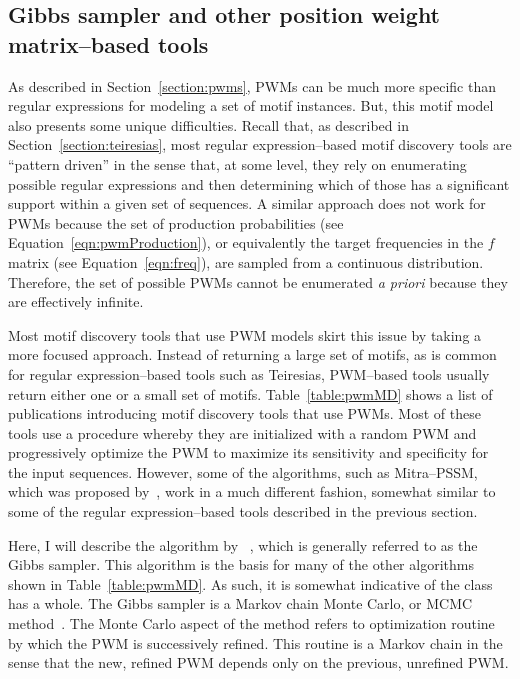\subsection*{Gibbs sampler and other position weight matrix--based tools}

As described in Section~\vref{section:pwms}, PWMs can be much more
specific than regular expressions for modeling a set of motif
instances.  But, this motif model also presents some unique
difficulties.  Recall that, as described in
Section~\vref{section:teiresias}, most regular expression--based
motif discovery tools are ``pattern driven'' in the sense that, at
some level, they rely on enumerating possible regular expressions
and then determining which of those has a significant support within
a given set of sequences.  A similar approach does not work for PWMs
because the set of production probabilities (see
Equation~\vref{eqn:pwmProduction}), or equivalently the target
frequencies in the $f$ matrix (see Equation~\vref{eqn:freq}), are
sampled from a continuous distribution.  Therefore, the set of
possible PWMs cannot be enumerated \emph{a priori} because they are
effectively infinite.

Most motif discovery tools that use PWM models skirt this issue by
taking a more focused approach.  Instead of returning a large set of
motifs, as is common for regular expression--based tools such as
Teiresias, PWM--based tools usually return either one or a small set
of motifs.  Table~\vref{table:pwmMD} shows a list of publications
introducing motif discovery tools that use PWMs.  Most of these
tools use a procedure whereby they are initialized with a random PWM
and progressively optimize the PWM to maximize its sensitivity and
specificity for the input sequences. However, some of the
algorithms, such as Mitra--PSSM, which was proposed
by~\citet{eskin2004from}, work in a much different fashion, somewhat
similar to some of the regular expression--based tools described in
the previous section.



Here, I will describe the algorithm by
~\citet{lawrence1993detecting}, which is generally referred to as
the Gibbs sampler.  This algorithm is the basis for many of the
other algorithms shown in Table~\ref{table:pwmMD}.  As such, it is
somewhat indicative of the class has a whole. The Gibbs sampler is a
Markov chain Monte Carlo, or MCMC
method~\cite{metropolis1953equation,liu2001monte}.  The Monte Carlo
aspect of the method refers to optimization routine by which the PWM
is successively refined.  This routine is a Markov chain in the
sense that the new, refined PWM depends only on the previous,
unrefined PWM\@.

